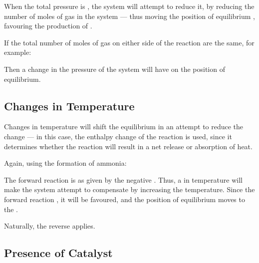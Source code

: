 			When the total pressure is , the system will attempt to reduce it, by reducing the number of moles of gas
			in the system --- thus moving the position of equilibrium , favouring the production of .

			\pagebreak
			If the total number of moles of gas on either side of the reaction are the same, for example:


			Then a change in the pressure of the system will have  on the position of equilibrium.



		\subsection{Changes in Temperature}

			Changes in temperature will shift the equilibrium in an attempt to reduce the change --- in this case, the enthalpy change
			of the reaction is used, since it determines whether the reaction will result in a net release or absorption of heat.

			Again, using the formation of ammonia:


			The forward reaction is  as given by the negative \enth{}. Thus, a  in temperature will
			make the system attempt to compensate by increasing the temperature. Since the forward reaction , it will
			be favoured, and the position of equilibrium moves to the .

			Naturally, the reverse applies.



		\subsection{Presence of Catalyst}

